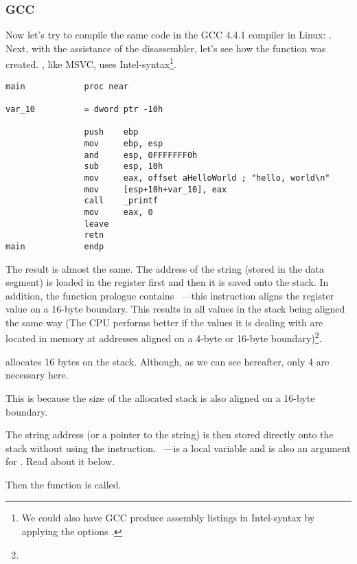 \subsubsection{GCC}

Now let's try to compile the same \CCpp code in the GCC 4.4.1 compiler in Linux: .
Next, with the assistance of the \IDA disassembler, let's see how the \main function was created.
\IDA, like MSVC, uses Intel-syntax\footnote{We could also have GCC produce assembly listings in Intel-syntax by applying the options .}.

\begin{lstlisting}[caption=code in \IDA]
main            proc near

var_10          = dword ptr -10h

                push    ebp
                mov     ebp, esp
                and     esp, 0FFFFFFF0h
                sub     esp, 10h
                mov     eax, offset aHelloWorld ; "hello, world\n"
                mov     [esp+10h+var_10], eax
                call    _printf
                mov     eax, 0
                leave
                retn
main            endp
\end{lstlisting}

The result is almost the same.
The address of the  string (stored in the data segment) is loaded in the \EAX register first and then it is saved onto the stack.
In addition, the function prologue contains ~---this 
instruction aligns the \ESP register value on a 16-byte boundary.
This results in all values in the stack being aligned the same way (The CPU performs better if the values it is dealing with are located in memory at addresses aligned 
on a 4-byte or 16-byte boundary)\footnote{\URLWPDA}.

 allocates 16 bytes on the stack. Although, as we can see hereafter, only 4 are necessary here.

This is because the size of the allocated stack is also aligned on a 16-byte boundary.

The string address (or a pointer to the string) is then stored directly onto the stack without using the \PUSH instruction.
~---is a local variable and is also an argument for \printf{}.
Read about it below.

Then the \printf function is called.

